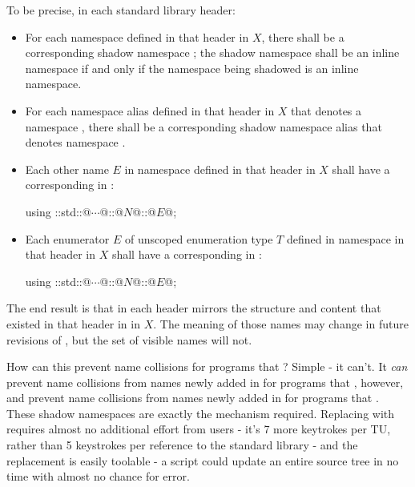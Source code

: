 To be precise, in each standard library header:
\begin{itemize}
\item For each namespace  defined in that header
  in \Cpp$X$, there shall be a corresponding shadow namespace
  ; the shadow namespace shall be an inline
  namespace if and only if the namespace being shadowed is an inline namespace.

\item For each namespace alias  defined in that
  header in \Cpp$X$ that denotes a namespace
  , there shall be
  a corresponding shadow namespace alias
   that denotes namespace
  .

\item Each other name $E$ in namespace 
  defined in that header in \Cpp$X$ shall have a corresponding
   in :
  \begin{codeblock}
  using ::std::@$\cdots$@::@$N$@::@$E$@;
  \end{codeblock}

\item Each enumerator $E$ of unscoped enumeration type $T$ defined in namespace
   in that header in \Cpp$X$ shall have
  a corresponding 
  in :
  \begin{codeblock}
  using ::std::@$\cdots$@::@$N$@::@$E$@;
  \end{codeblock}
\end{itemize}
The end result is that  in each header mirrors
the structure and content that existed in that header in  in \Cpp$X$.
The meaning of those names may change in future revisions of \Cpp, but the set
of visible names will not.

How can this prevent name collisions for programs that
? Simple - it can't. It \emph{can} prevent name
collisions from names newly added in  for programs that
, however, and prevent name collisions
from names newly added in  for programs that
. These shadow namespaces are exactly the
mechanism required. Replacing  with
 requires almost no additional effort from
users - it's 7 more keytrokes per TU, rather than 5 keystrokes per reference to
the standard library - and the replacement is easily toolable - a 
script could update an entire source tree in no time with almost no chance for
error.

